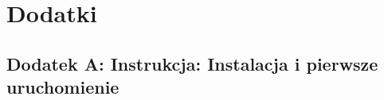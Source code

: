 \chapter{Dodatki}
\label{cha:dodatki}




\section{Dodatek A: Instrukcja: Instalacja i pierwsze uruchomienie}
\label{sec:instrukcjaInstalacjaIPierwszeUruchomienia}

